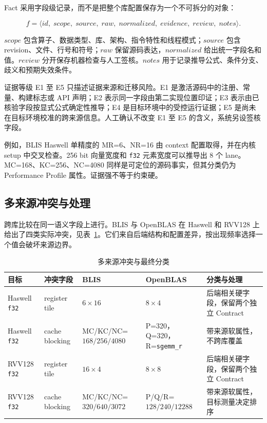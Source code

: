 Fact 采用字段级记录，而不是把整个库配置保存为一个不可拆分的对象：

\begin{equation}
f=\langle
id,\;scope,\;source,\;raw,\;normalized,\;evidence,\;review,\;notes
\rangle .
\label{eq:chapter3-fact-record}
\end{equation}

$scope$ 包含算子、数据类型、库、架构、指令特性和线程模式；$source$ 包含 revision、文件、行号和符号；$raw$ 保留源码表达，$normalized$ 给出统一字段名和值。$review$ 分开保存机器检查与人工签核。$notes$ 用于记录推导公式、条件分支、歧义和预期失效条件。

证据等级 E1 至 E5 只描述证据来源和迁移风险。E1 是激活源码中的注册、常量、构建标志或 API 声明；E2 表示同一字段由第二实现位置印证；E3 表示由已核验字段按显式公式确定性推导；E4 是目标环境中的受控运行证据；E5 是尚未在目标环境校准的跨来源信息。人工确认不改变 E1 至 E5 的含义，系统另设签核字段。

例如，BLIS Haswell 单精度的 MR=6、NR=16 由 context 配置取得，并在内核 setup 中交叉检查。256 bit 向量宽度和 \texttt{f32} 元素宽度可以推导出 8 个 lane。MC=168、KC=256、NC=4080 同样是可定位的源码事实，但其分类仍为 Performance Profile 属性。证据强不等于约束硬。

\subsection{多来源冲突与处理}

跨库比较在同一语义字段上进行。BLIS 与 OpenBLAS 在 Haswell 和 RVV128 上给出了四类实际冲突，见表~\ref{tab:chapter3-conflicts}。它们来自后端结构和配置差异，按出现频率选择一个值会破坏来源边界。

\begin{table}[!htbp]
  \centering
  \caption{多来源冲突与最终分类}
  \label{tab:chapter3-conflicts}
  \begingroup
  \begin{tabularx}{\textwidth}{
    @{}
    >{\raggedright\arraybackslash}p{}
    >{\raggedright\arraybackslash}p{}
    >{\raggedright\arraybackslash}p{}
    >{\raggedright\arraybackslash}p{}
    >{\raggedright\arraybackslash}X
    @{}
  }
    \toprule
    \textbf{目标} & \textbf{冲突字段} & \textbf{BLIS} &
    \textbf{OpenBLAS} & \textbf{分类与处理} \\
    \midrule
    Haswell \texttt{f32} &
    register tile &
    $6\times16$ &
    $8\times4$ &
    后端相关硬字段，保留两个独立 Contract \\
    Haswell \texttt{f32} &
    cache blocking &
    MC/KC/NC=$168/256/4080$ &
    \makecell[l]{P=320，Q=320，\\R=\texttt{sgemm\_r}} &
    带来源软属性，不跨库覆盖 \\
    RVV128 \texttt{f32} &
    register tile &
    $16\times4$ &
    $8\times8$ &
    后端相关硬字段，保留两个独立 Contract \\
    RVV128 \texttt{f32} &
    cache blocking &
    MC/KC/NC=$320/640/3072$ &
    P/Q/R=$128/240/12288$ &
    带来源软属性，目标测量决定排序 \\
    \bottomrule
  \end{tabularx}
  \endgroup
\end{table}

